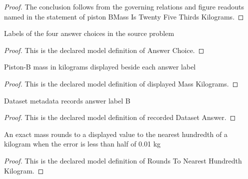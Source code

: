 \begin{proof}
  The conclusion follows from the governing relations and figure readouts named in the statement of piston BMass Is Twenty Five Thirds Kilograms.
\end{proof}
\begin{definition}
  \label{def:physics:phyx-mini-0390:phyxminiproblems-problemphyxmini0390-answerchoice}
  Labels of the four answer choices in the source problem
\end{definition}
\begin{proof}
  This is the declared model definition of Answer Choice.
\end{proof}
\begin{definition}
  \label{def:physics:phyx-mini-0390:phyxminiproblems-problemphyxmini0390-displayedmasskilograms}
  Piston-B mass in kilograms displayed beside each answer label
\end{definition}
\begin{proof}
  This is the declared model definition of displayed Mass Kilograms.
\end{proof}
\begin{definition}
  \label{def:physics:phyx-mini-0390:phyxminiproblems-problemphyxmini0390-recordeddatasetanswer}
  Dataset metadata records answer label B
\end{definition}
\begin{proof}
  This is the declared model definition of recorded Dataset Answer.
\end{proof}
\begin{definition}
  \label{def:physics:phyx-mini-0390:phyxminiproblems-problemphyxmini0390-roundstonearesthundredthkilogram}
  An exact mass rounds to a displayed value to the nearest hundredth of a kilogram when the error is less than half of 0.01 kg
\end{definition}
\begin{proof}
  This is the declared model definition of Rounds To Nearest Hundredth Kilogram.
\end{proof}
